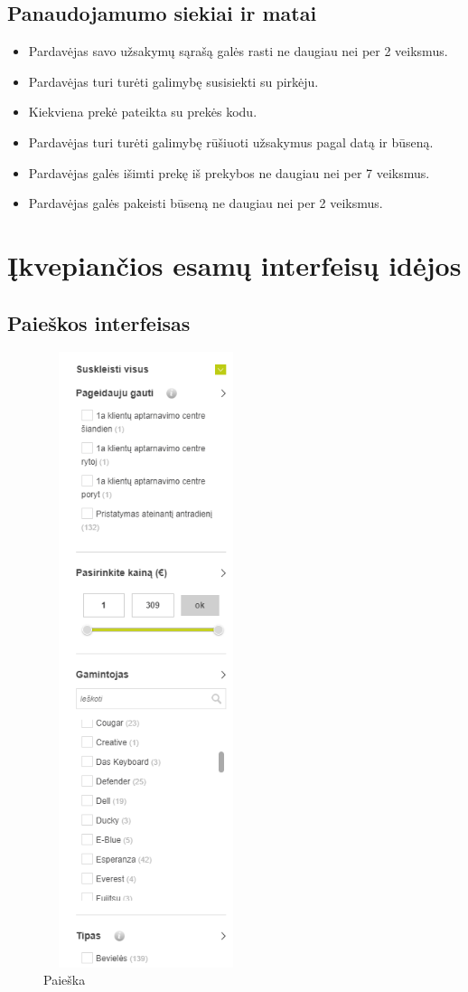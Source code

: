 \documentclass[oneside]{VUMIFPSkursinis}
\begin{document}
	\subsection{Panaudojamumo siekiai ir matai}
		\begin{itemize}
			\item{Pardavėjas savo užsakymų sąrašą galės rasti ne daugiau nei per 2 veiksmus.}
			\item{Pardavėjas turi turėti galimybę susisiekti su pirkėju.}
			\item{Kiekviena prekė pateikta su prekės kodu.}
			\item{Pardavėjas turi turėti galimybę rūšiuoti užsakymus pagal datą ir būseną.}
			\item{Pardavėjas galės išimti prekę iš prekybos ne daugiau nei per 7 veiksmus.}
			\item{Pardavėjas galės pakeisti būseną ne daugiau nei per 2 veiksmus.}
		\end{itemize}
\section{Įkvepiančios esamų interfeisų idėjos}
	\subsection{Paieškos interfeisas}
		\begin{figure}[h]
			\centering
			\includegraphics[width=6cm,height=18cm,keepaspectratio]{IkvepiantisInterfeisas1.png}
			\caption{ Paieška}
		\end{figure}
\end{document}
